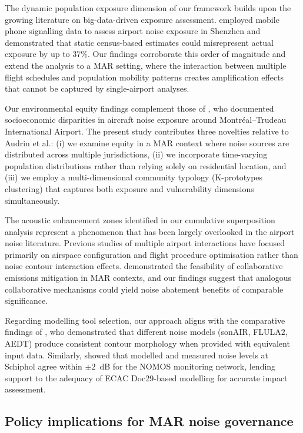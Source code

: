 \documentclass[review,12pt]{elsarticle}
\begin{document}
The dynamic population exposure dimension of our framework builds upon the growing literature on big-data-driven exposure assessment. \citet{zhu2025dynamic} employed mobile phone signalling data to assess airport noise exposure in Shenzhen and demonstrated that static census-based estimates could misrepresent actual exposure by up to 37\%. Our findings corroborate this order of magnitude and extend the analysis to a MAR setting, where the interaction between multiple flight schedules and population mobility patterns creates amplification effects that cannot be captured by single-airport analyses.

Our environmental equity findings complement those of \citet{audrin2022aircraft}, who documented socioeconomic disparities in aircraft noise exposure around Montréal–Trudeau International Airport. The present study contributes three novelties relative to Audrin et al.: (i) we examine equity in a MAR context where noise sources are distributed across multiple jurisdictions, (ii) we incorporate time-varying population distributions rather than relying solely on residential location, and (iii) we employ a multi-dimensional community typology (K-prototypes clustering) that captures both exposure and vulnerability dimensions simultaneously.

The acoustic enhancement zones identified in our cumulative superposition analysis represent a phenomenon that has been largely overlooked in the airport noise literature. Previous studies of multiple airport interactions have focused primarily on airspace configuration and flight procedure optimisation rather than noise contour interaction effects. \citet{han2025high} demonstrated the feasibility of collaborative emissions mitigation in MAR contexts, and our findings suggest that analogous collaborative mechanisms could yield noise abatement benefits of comparable significance.

Regarding modelling tool selection, our approach aligns with the comparative findings of \citet{meister2021comparison}, who demonstrated that different noise models (sonAIR, FLULA2, AEDT) produce consistent contour morphology when provided with equivalent input data. Similarly, \citet{simons2022comparative} showed that modelled and measured noise levels at Schiphol agree within $\pm 2$~dB for the NOMOS monitoring network, lending support to the adequacy of ECAC Doc29-based modelling for accurate impact assessment.

\subsection{Policy implications for MAR noise governance}
\end{document}
